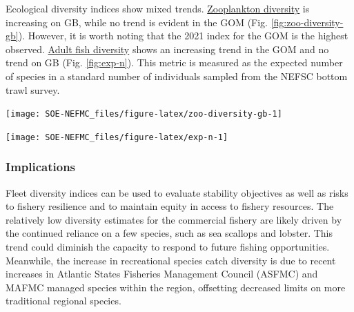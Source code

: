 \documentclass[
  10pt,
]{article}
\let\origfigure\figure
\let\endorigfigure\endfigure
\renewenvironment{figure}[1][2] {
    \expandafter\origfigure\expandafter[H]
} {
    \endorigfigure
}
\begin{document}
Ecological diversity indices show mixed trends. \href{https://noaa-edab.github.io/catalog/zoo_diversity.html}{Zooplankton diversity} is increasing on GB, while no trend is evident in the GOM (Fig. \ref{fig:zoo-diversity-gb}). However, it is worth noting that the 2021 index for the GOM is the highest observed. \href{https://noaa-edab.github.io/catalog/exp_n.html}{Adult fish diversity} shows an increasing trend in the GOM and no trend on GB (Fig. \ref{fig:exp-n}). This metric is measured as the expected number of species in a standard number of individuals sampled from the NEFSC bottom trawl survey.

\begin{figure}

{\centering \texttt{[image: SOE-NEFMC\_files/figure-latex/zoo-diversity-gb-1]} 

}

\caption{Zooplankton diversity on Georges Bank and in the Gulf of Maine, based on Shannon diversity index. 2020 surveys were incomplete due to COVID-19.}\label{fig:zoo-diversity-gb}
\end{figure}
\begin{figure}

{\centering \texttt{[image: SOE-NEFMC\_files/figure-latex/exp-n-1]} 

}

\caption{Adult fish diversity for Georges Bank and in the Gulf of Maine, based on expected number of species. Results from survey vessels Albatross and Bigelow are reported separately due to catchability differences.}\label{fig:exp-n}
\end{figure}

\hypertarget{implications-3}{%
\subsubsection{Implications}\label{implications-3}}

Fleet diversity indices can be used to evaluate stability objectives as well as risks to fishery resilience and to maintain equity in access to fishery resources. The relatively low diversity estimates for the commercial fishery are likely driven by the continued reliance on a few species, such as sea scallops and lobster. This trend could diminish the capacity to respond to future fishing opportunities. Meanwhile, the increase in recreational species catch diversity is due to recent increases in Atlantic States Fisheries Management Council (ASFMC) and MAFMC managed species within the region, offsetting decreased limits on more traditional regional species.
\end{document}
